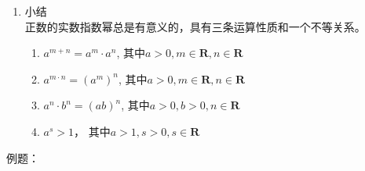 \begin{enumerate}
        证明思路：无理数可以由有理数夹逼趋近，对应的正数的无理数指数幂也可以由正数的有理数指数幂夹逼得到。
    \item 小结 \\
        正数的实数指数幂总是有意义的，具有三条运算性质和一个不等关系。
        \begin{enumerate}
            \item $a^{m+n} = a^m \cdot a^n$, 其中$a > 0, m \in \mathbf{R}, n \in \mathbf{R}$
            \item $a^{m \cdot n} = (a^m)^n$, 其中$a > 0, m \in \mathbf{R}, n \in \mathbf{R}$
            \item $a^n \cdot b^n = (ab)^n$, 其中$a > 0, b > 0, n \in \mathbf{R}$
            \item $a^s > 1$， 其中$a > 1, s > 0, s \in \mathbf{R}$
        \end{enumerate}
\end{enumerate}
例题：
